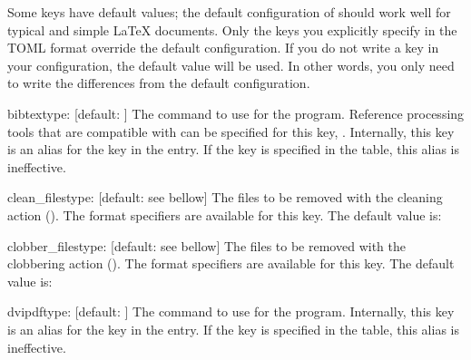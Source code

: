 \documentclass{llmk-doc}
\begin{document}
Some keys have default values; the default configuration of  should
work well for typical and simple {\LaTeX} documents. Only the keys you
explicitly specify in the TOML format override the default configuration. If
you do not write a key in your configuration, the default value will be used.
In other words, you only need to write the differences from the default
configuration.

\begin{confkey}{bibtex}{type: }[default: ]
The command to use for the  program. Reference processing
tools that are compatible with {\BibTeX} can be specified for this key, \eg
{}. Internally, this key is an alias for the  key in
the  entry. If the  key is specified in the
 table, this alias is ineffective.
\end{confkey}

\begin{confkey}{clean\_files}{type: }
  [default: see bellow]
The files to be removed with the cleaning action (). The format
specifiers are available for this key. The default value is:
%
\begin{htcode}
[
  "%
  "%
  "%
]
\end{htcode}
\end{confkey}

\begin{confkey}{clobber\_files}{type: }
  [default: see bellow]
The files to be removed with the clobbering action (). The format
specifiers are available for this key. The default value is:
%
\end{confkey}

\begin{confkey}{dvipdf}{type: }[default: ]
The command to use for the  program. Internally, this key is
an alias for the  key in the  entry. If the
 key is specified in the  table, this alias is
ineffective.
\end{confkey}
\end{document}
